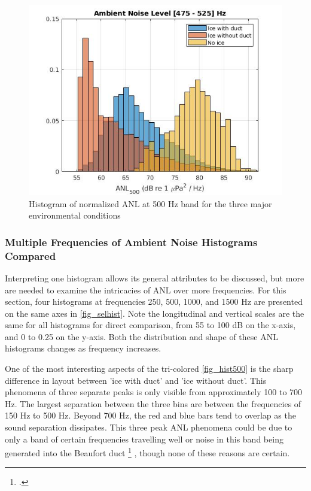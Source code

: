 \begin{figure}[h]
\centering
\includegraphics[scale=0.6]{Figures/ANL_500.jpg}
\caption{Histogram of normalized ANL at 500 Hz band for the three major environmental conditions}
\label{fig_hist500}
\end{figure}


\subsubsection{Multiple Frequencies of Ambient Noise Histograms Compared}
Interpreting one histogram allows its general attributes to be discussed, but more are needed to examine the intricacies of ANL over more frequencies.  For this section, four histograms at frequencies 250, 500, 1000, and 1500 Hz are presented on the same axes in \autoref{fig_selhist}. Note the longitudinal and vertical scales are the same for all histograms for direct comparison, from 55 to 100 dB on the x-axis, and 0 to 0.25 on the y-axis. Both the distribution and shape of these ANL histograms changes as frequency increases. 


One of the most interesting aspects of the tri-colored \autoref{fig_hist500} is the sharp difference in layout between 'ice with duct' and 'ice without duct'. This phenomena of three separate peaks is only visible from approximately 100 to 700 Hz. The largest separation between the three bins are between the frequencies of 150 Hz to 500 Hz. Beyond 700 Hz, the red and blue bars tend to overlap as the sound separation dissipates. This three peak ANL phenomena could be due to only a band of certain frequencies travelling well or noise in this band being generated into the Beaufort duct \footcite{beaufortduct} , though none of these reasons are certain.

